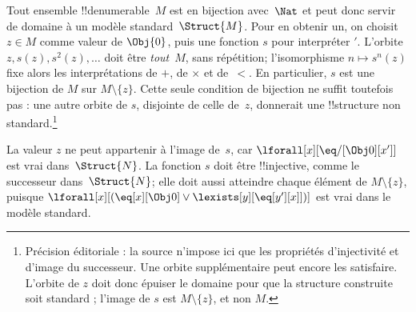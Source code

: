 \documentclass[../../../include/open-logic-section]{subfiles}
\begin{document}
\begin{explain}
Tout ensemble !!{denumerable}~$M$ est en bijection
avec~$\Nat$ et peut donc servir de domaine à un
modèle standard~$\Struct{M}$. Pour en obtenir un,
on choisit $z\in M$ comme valeur de $\Obj{0}$,
puis une fonction $s$ pour interpréter $\prime$.
L'orbite $z,s(z),s^2(z),\dots$ doit être
\emph{tout}~$M$, sans répétition; l'isomorphisme
$n\mapsto s^n(z)$ fixe alors les interprétations
de $+$, de $\times$ et de~$<$. En particulier,
$s$ est une bijection de $M$ sur
$M\setminus\{z\}$. Cette seule condition de
bijection ne suffit toutefois pas : une autre
orbite de $s$, disjointe de celle de~$z$,
donnerait une !!{structure} non standard.\footnote{Précision éditoriale : la source n'impose ici que les propriétés d'injectivité et d'image du successeur. Une orbite supplémentaire peut encore les satisfaire. L'orbite de $z$ doit donc épuiser le domaine pour que la structure construite soit standard ; l'image de $s$ est $M\setminus\{z\}$, et non $M$.}

La valeur $z$ ne peut appartenir à l'image de~$s$,
car $\lforall[x][\eq/[\Obj 0][x']]$ est vrai
dans~$\Struct{N}$. La fonction $s$ doit être
!!{injective}, comme le successeur dans~$\Struct{N}$;
elle doit aussi atteindre chaque élément de
$M\setminus\{z\}$, puisque
$\lforall[x][(\eq[x][\Obj 0]\lor
\lexists[y][\eq[y'][x]])]$ est vrai dans
le modèle standard.
\end{explain}
\end{document}
